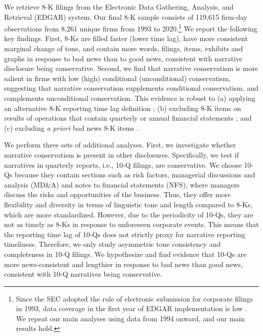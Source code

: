 \documentclass[letterpaper,12pt]{article}
\begin{document}
\begin{spacing}{1.5}
We retrieve 8-K filings from the Electronic Data Gathering, Analysis, and Retrieval (EDGAR) system. Our final 8-K sample consists of 119,615 firm-day observations from 8,261 unique firms from 1993 to 2020.\footnote{Since the SEC adopted the rule of electronic submission for corporate filings in 1993, data coverage in the first year of EDGAR implementation is low \cite{gaoInformingMarketEffect2020}. We repeat our main analyses using data from 1994 onward, and our main results hold.} We report the following key findings. First, 8-Ks are filled faster (lower time lag), have more consistent marginal change of tone, and contain more words, filings, items, exhibits and graphs in response to bad news than to good news, consistent with narrative disclosure being conservative. Second, we find that narrative conservatism is more salient in firms with low (high) conditional (unconditional) conservatism, suggesting that narrative conservatism supplements conditional conservatism, and complements unconditional conservatism. This evidence is robust to (a) applying an alternative 8-K reporting time lag definition \cite{carterRelevanceForm8K1999, niessnerStrategicDisclosureTiming2015, chapmanInformationOverloadDisclosure2019}; (b) excluding 8-K items on results of operations that contain quarterly or annual financial statements \cite{segalAreManagersStrategic2016}; and (c) excluding \textit{a priori }bad news 8-K items \cite{segalAreManagersStrategic2016}.

We perform three sets of additional analyses. First, we investigate whether narrative conservatism is present in other disclosures. Specifically, we test if narratives in quarterly reports, i.e., 10-Q filings, are conservative. We choose 10-Qs because they contain sections such as risk factors, managerial discussions and analysis (MD\&A) and notes to financial statements (NFS), where managers discuss the risks and opportunities of the business. Thus, they offer more flexibility and diversity in terms of linguistic tone and length compared to 8-Ks, which are more standardized. However, due to the periodicity of 10-Qs, they are not as timely as 8-Ks in response to unforeseen corporate events. This means that the reporting time lag of 10-Qs does not strictly proxy for narrative reporting timeliness. Therefore, we only study asymmetric tone consistency and completeness in 10-Q filings. We hypothesize and find evidence that 10-Qs are more news-consistent and lengthier in response to bad news than good news, consistent with 10-Q narratives being conservative.  


\end{spacing}
\end{document}
